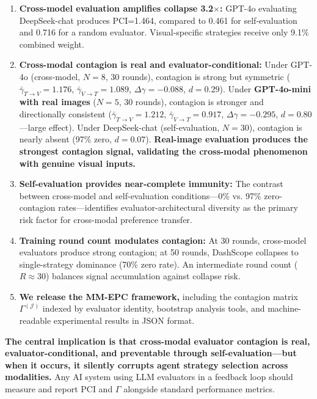 \documentclass[11pt,a4paper]{article}
\begin{document}
\begin{enumerate}[leftmargin=*]
    \item \textbf{Cross-model evaluation amplifies collapse 3.2$\times$:} GPT-4o evaluating DeepSeek-chat produces PCI=1.464, compared to 0.461 for self-evaluation and 0.716 for a random evaluator. Visual-specific strategies receive only 9.1\% combined weight.
    \item \textbf{Cross-modal contagion is real and evaluator-conditional:} Under GPT-4o (cross-model, $N=8$, 30 rounds), contagion is strong but symmetric ($\bar{\gamma}_{T\to V}=1.176$, $\bar{\gamma}_{V\to T}=1.089$, $\Delta\gamma=-0.088$, $d=0.29$). Under \textbf{GPT-4o-mini with real images} ($N=5$, 30 rounds), contagion is stronger and directionally consistent ($\bar{\gamma}_{T\to V}=1.212$, $\bar{\gamma}_{V\to T}=0.917$, $\Delta\gamma=-0.295$, $d=0.80$---large effect). Under DeepSeek-chat (self-evaluation, $N=30$), contagion is nearly absent (97\% zero, $d=0.07$). \textbf{Real-image evaluation produces the strongest contagion signal, validating the cross-modal phenomenon with genuine visual inputs.}
    \item \textbf{Self-evaluation provides near-complete immunity:} The contrast between cross-model and self-evaluation conditions---0\% vs. 97\% zero-contagion rates---identifies evaluator-architectural diversity as the primary risk factor for cross-modal preference transfer.
    \item \textbf{Training round count modulates contagion:} At 30 rounds, cross-model evaluators produce strong contagion; at 50 rounds, DashScope collapses to single-strategy dominance (70\% zero rate). An intermediate round count ($R \approx 30$) balances signal accumulation against collapse risk.
    \item \textbf{We release the MM-EPC framework,} including the contagion matrix $\Gamma^{(\mathcal{J})}$ indexed by evaluator identity, bootstrap analysis tools, and machine-readable experimental results in JSON format.
\end{enumerate}

\textbf{The central implication is that cross-modal evaluator contagion is real, evaluator-conditional, and preventable through self-evaluation---but when it occurs, it silently corrupts agent strategy selection across modalities.} Any AI system using LLM evaluators in a feedback loop should measure and report PCI and $\Gamma$ alongside standard performance metrics.
\end{document}
